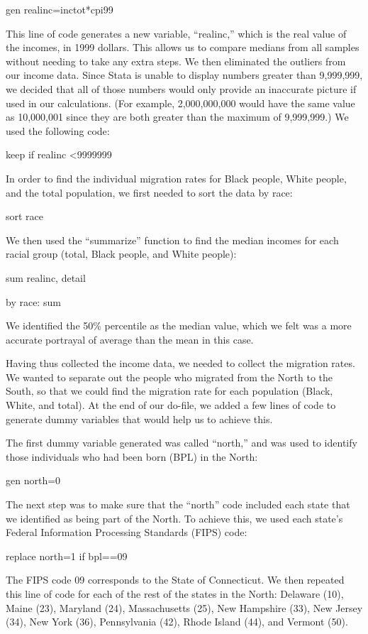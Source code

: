 \documentclass[12pt]{article}
\begin{document}
gen realinc=inctot*cpi99 

This line of code generates a new variable, “realinc,” which is the real value of the incomes, in 1999 dollars. This allows us to compare medians from all samples without needing to take any extra steps. We then eliminated the outliers from our income data. Since Stata is unable to display numbers greater than 9,999,999, we decided that all of those numbers would only provide an inaccurate picture if used in our calculations. (For example, 2,000,000,000 would have the same value as 10,000,001 since they are both greater than the maximum of 9,999,999.) We used the following code: 

keep if realinc <9999999 

In order to find the individual migration rates for Black people, White people, and the total population, we first needed to sort the data by race: 

sort race 

We then used the “summarize” function to find the median incomes for each racial group (total, Black people, and White people): 

sum realinc, detail 

by race: sum  

We identified the 50\% percentile as the median value, which we felt was a more accurate portrayal of average than the mean in this case. 

Having thus collected the income data, we needed to collect the migration rates. We wanted to separate out the people who migrated from the North to the South, so that we could find the migration rate for each population (Black, White, and total). At the end of our do-file, we added a few lines of code to generate dummy variables that would help us to achieve this. 

The first dummy variable generated was called “north,” and was used to identify those individuals who had been born (BPL) in the North: 

gen north=0 

The next step was to make sure that the “north” code included each state that we identified as being part of the North. To achieve this, we used each state’s Federal Information Processing Standards (FIPS) code: 

replace north=1 if bpl==09 

The FIPS code 09 corresponds to the State of Connecticut. We then repeated this line of code for each of the rest of the states in the North: Delaware (10), Maine (23), Maryland (24), Massachusetts (25), New Hampshire (33), New Jersey (34), New York (36), Pennsylvania (42), Rhode Island (44), and Vermont (50). 
\end{document}
